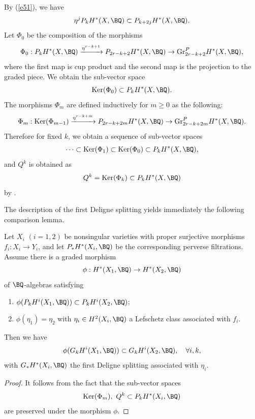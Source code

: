 By (\ref{e51}), we have
\[
\eta^j P_k H^*(X, \BQ) \subset P_{k+2j}H^*(X, \BQ).
\]
Let $\Phi_0$ be the composition of the morphisms
\[
\Phi_0: P_kH^*(X, \BQ) \xrightarrow{\eta^{r-k+1}} P_{2r-k+2}H^*(X, \BQ) \to \mathrm{Gr}_{2r-k+2}^PH^*(X, \BQ),
\]
where the first map is cup product and the second map is the projection to the graded piece. We obtain the sub-vector space
\[
\mathrm{Ker}(\Phi_0) \subset P_kH^*(X, \BQ).
\]
The morphisms $\Phi_m$ are defined inductively for $m\geq 0$ as the following:
\[
\Phi_m: \mathrm{Ker}(\Phi_{m-1}) \xrightarrow{\eta^{r-k+m}} P_{2r-k+2m}H^*(X, \BQ) \to \mathrm{Gr}_{2r-k+2m}^PH^*(X, \BQ).
\]
Therefore for fixed $k$, we obtain a sequence of sub-vector spaces
\[
\cdots \subset \mathrm{Ker}(\Phi_1) \subset \mathrm{Ker}(\Phi_0) \subset P_kH^*(X, \BQ),
\]
and $Q^k$ is obtained as
\[
Q^k = \mathrm{Ker}(\Phi_k) \subset P_kH^*(X, \BQ)
\]
by \cite[Proposition 2.7.1]{dCM4}.

The description of the first Deligne splitting yields immediately the following comparison lemma.

\begin{lem}
\notready\label{comparison1}
Let $X_i$ $(i=1,2)$ be nonsingular varieties with proper surjective morphisms $f_i: X_i \to Y_i$, and let $P_*H^*(X_i, \BQ)$ be the corresponding perverse filtrations. Assume there is a graded morphism
\[
\phi: H^*(X_1, \BQ) \to H^*(X_2, \BQ)
\]
of $\BQ$-algebras satisfying
\begin{enumerate}
    \item[(a)] $\phi(P_kH^i(X_1, \BQ)) \subset P_kH^i(X_2, \BQ)$;
    \item[(b)] $\phi(\eta_1) = \eta_2$ with $\eta_i \in H^2(X_i, \BQ)$ a Lefschetz class associated with $f_i$.
\end{enumerate}
Then we have
\[
\phi(G_kH^i(X_1, \BQ)) \subset G_k H^i(X_2, \BQ), \quad \forall i,k,
\]
with $G_*H^*(X_i, \BQ)$ the first Deligne splitting associated with $\eta_i$.
\end{lem}

\begin{proof}
It follows from the fact that the sub-vector spaces
\[
\mathrm{Ker}(\Phi_m), ~ Q^k \subset P_kH^*(X_i, \BQ)
\]
are preserved under the morphism $\phi$.
\end{proof}

